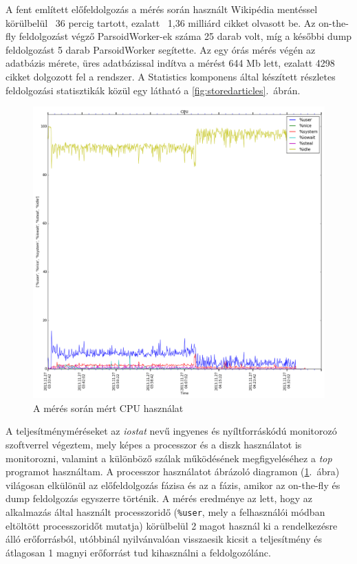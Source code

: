 A fent említett előfeldolgozás a mérés során használt Wikipédia mentéssel körülbelül ~36 percig tartott, ezalatt ~1,36 milliárd cikket olvasott be. Az on-the-fly feldolgozást végző ParsoidWorker-ek száma 25 darab volt, míg a későbbi dump feldolgozást 5 darab ParsoidWorker segítette. Az egy órás mérés végén az adatbázis mérete, üres adatbázissal indítva a mérést 644 Mb lett, ezalatt 4298 cikket dolgozott fel a rendszer. A Statistics komponens által készített részletes feldolgozási statisztikák közül egy látható a \ref{fig:storedarticles}.~ábrán.

\begin{figure}[htb]
\centering
\includegraphics[scale=0.3]{img/measurement_cpu}
\caption{A mérés során mért CPU használat}
\label{fig:measurement_cpu}
\end{figure}

A teljesítményméréseket az \textit{iostat} nevű ingyenes és nyíltforráskódú monitorozó szoftverrel végeztem, mely képes a processzor és a diszk használatot is monitorozni, valamint a különböző szálak működésének megfigyeléséhez a \textit{top} programot használtam. A processzor használatot ábrázoló diagramon (\ref{fig:measurement_cpu}.~ábra) világosan elkülönül az előfeldolgozás fázisa és az a fázis, amikor az on-the-fly és dump feldolgozás egyszerre történik. A mérés eredménye az lett, hogy az alkalmazás által használt processzoridő (\texttt{\%user}, mely a felhasználói módban eltöltött processzoridőt mutatja) körülbelül 2 magot használ ki a rendelkezésre álló erőforrásból, utóbbinál nyilvánvalóan visszaesik kicsit a teljesítmény és átlagosan 1 magnyi erőforrást tud kihasználni a feldolgozólánc.


